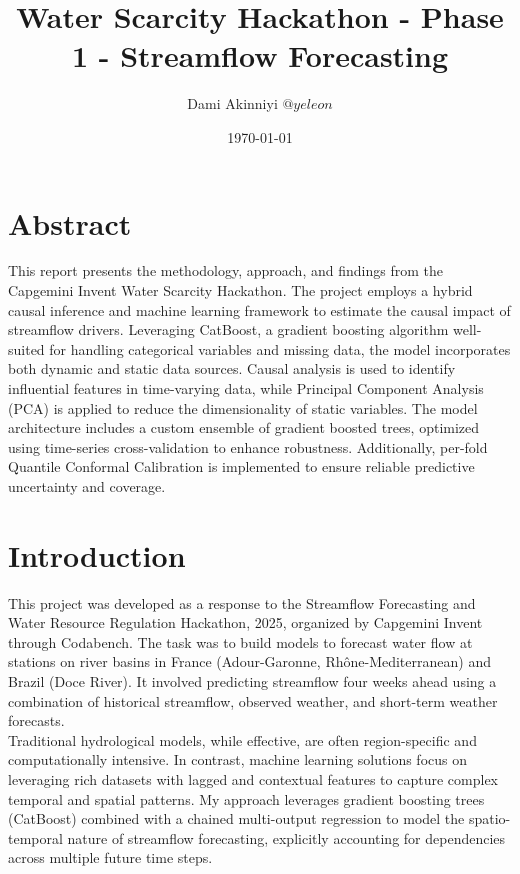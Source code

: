 \documentclass[a4paper,12pt]{article}
\title{Water Scarcity Hackathon - Phase 1 - Streamflow Forecasting}
\author{Dami Akinniyi \textit{\(@yeleon\)}}
\date{\today}
\begin{document}
\maketitle

\section*{Abstract}
This report presents the methodology, approach, and findings from the Capgemini Invent 
Water Scarcity Hackathon. The project employs a hybrid causal inference and machine 
learning framework to estimate the causal impact of streamflow drivers. 
Leveraging CatBoost, a gradient boosting algorithm well-suited for handling categorical 
variables and missing data, the model incorporates both dynamic and static data sources. 
Causal analysis is used to identify influential features in time-varying data, while 
Principal Component Analysis (PCA) is applied to reduce the dimensionality of static 
variables. The model architecture includes a custom ensemble of gradient boosted trees, 
optimized using time-series cross-validation to enhance robustness. Additionally, 
per-fold Quantile Conformal Calibration is implemented to ensure reliable predictive 
uncertainty and coverage.


\section{Introduction}
This project was developed as a response to the Streamflow Forecasting and Water 
Resource Regulation Hackathon, 2025, organized by Capgemini Invent through Codabench. 
The task was to build models to forecast water flow at stations on river basins in 
France (Adour-Garonne, Rhône-Mediterranean) and Brazil (Doce River). It involved 
predicting streamflow four weeks ahead using a combination of historical streamflow, 
observed weather, and short-term weather forecasts.\\ 

Traditional hydrological models, while effective, are often region-specific and 
computationally intensive. In contrast, machine learning solutions focus on leveraging 
rich datasets with lagged and contextual features to capture complex temporal and 
spatial patterns. My approach leverages gradient boosting trees (CatBoost) combined 
with a chained multi-output regression to model the spatio-temporal nature of 
streamflow forecasting, explicitly accounting for dependencies across multiple future 
time steps.\\
\end{document}
